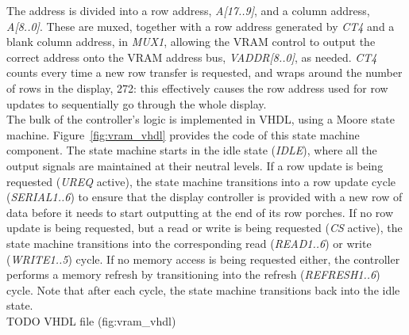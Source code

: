 \documentclass{scrartcl}
\begin{document}
	The address is divided into a row address, \textit{A[17..9]}, and a column address, \textit{A[8..0]}. These are muxed, together with a row address generated by \textit{CT4} and a blank column address, in \textit{MUX1}, allowing the VRAM control to output the correct address onto the VRAM address bus, \textit{VADDR[8..0]}, as needed. \textit{CT4} counts every time a new row transfer is requested, and wraps around the number of rows in the display, 272: this effectively causes the row address used for row updates to sequentially go through the whole display.\\

	The bulk of the controller's logic is implemented in VHDL, using a Moore state machine. Figure~\ref{fig:vram_vhdl} provides the code of this state machine component. The state machine starts in the idle state (\textit{IDLE}), where all the output signals are maintained at their neutral levels. If a row update is being requested (\textit{UREQ} active), the state machine transitions into a row update cycle (\textit{SERIAL1..6}) to ensure that the display controller is provided with a new row of data before it needs to start outputting at the end of its row porches. If no row update is being requested, but a read or write is being requested (\textit{CS} active), the state machine transitions into the corresponding read (\textit{READ1..6}) or write (\textit{WRITE1..5}) cycle. If no memory access is being requested either, the controller performs a memory refresh by transitioning into the refresh (\textit{REFRESH1..6}) cycle. Note that after each cycle, the state machine transitions back into the idle state.\\

	TODO VHDL file (fig:vram_vhdl)
\end{document}
